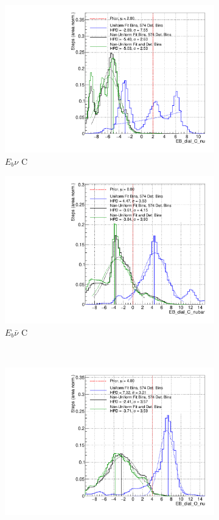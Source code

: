 \begin{figure}
\centering
\begin{subfigure}{.48\textwidth}
  \centering
  \includegraphics[width=0.73\linewidth]{figs/PolyComp_EB_dial_C_nu}
  \caption{$E_{b}\nu$ C}
\end{subfigure}
\begin{subfigure}{.48\textwidth}
  \centering
  \includegraphics[width=0.73\linewidth]{figs/PolyComp_EB_dial_C_nubar}
  \caption{$E_{b}\bar{\nu}$ C}
\end{subfigure} \\
\begin{subfigure}{.48\textwidth}
  \centering
  \includegraphics[width=0.73\linewidth]{figs/PolyComp_EB_dial_O_nu}

\end{subfigure}
\end{figure}

